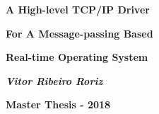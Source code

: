 \documentclass{article}
\begin{document}
\titlepage
\begin{center}
\vspace*{12\baselineskip}
\centerline{\Huge \textbf{A High-level TCP/IP Driver}}
\vspace{10pt}
\centerline{\Huge \textbf{For A Message-passing Based}}
\vspace{10pt}
\centerline{\Huge \textbf{Real-time Operating System}}



\vspace*{10\baselineskip}
{\Huge \textbf{\textit{Vitor Ribeiro Roriz}}}


\vspace*{28\baselineskip}
{\Huge \textbf{Master Thesis - 2018}}
\end{center}
\end{document}
